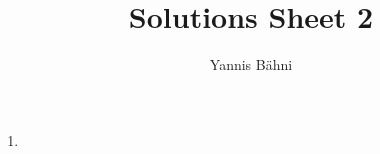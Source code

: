 

\title{Solutions Sheet 2}
\author{Yannis B\"{a}hni}
\address[Yannis B\"{a}hni]{University of Zurich, R\"{a}mistrasse 71, 8006 Zurich}


\maketitle
\thispagestyle{fancy}

\begin{enumerate}[label = \textbf{Exercise \arabic*.},wide = 0pt, itemsep=1.5ex]
	\item 
\end{enumerate}
\printbibliography

